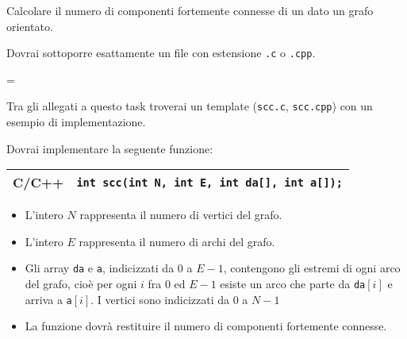 \usepackage{xcolor}
\usepackage{afterpage}
\usepackage{pifont,mdframed}
\usepackage[bottom]{footmisc}



\newcommand{\inputfile}{\texttt{input.txt}}
\newcommand{\outputfile}{\texttt{output.txt}}

\newenvironment{warning}
  {\par\begin{mdframed}[linewidth=2pt,linecolor=gray]%
    \begin{list}{}{\leftmargin=1cm
                   \labelwidth=\leftmargin}\item[\Large\ding{43}]}
  {\end{list}\end{mdframed}\par}

Calcolare il numero di componenti fortemente connesse di un dato un grafo orientato.

\Implementation


Dovrai sottoporre esattamente un file con estensione \texttt{.c} o \texttt{.cpp}.

\begin{warning}
Tra gli allegati a questo task troverai un template (\texttt{scc.c}, \texttt{scc.cpp}) con un esempio di implementazione.
\end{warning}

Dovrai implementare la seguente funzione:

\begin{center}\begin{tabularx}{\textwidth}{|c|X|}
\hline
C/C++  & \verb|int scc(int N, int E, int da[], int a[]);|\\
\hline
\end{tabularx}\end{center}

\begin{itemize}[nolistsep]
  \item L'intero $N$ rappresenta il numero di vertici del grafo.
  \item L'intero $E$ rappresenta il numero di archi del grafo.
  \item Gli array \texttt{da} e \texttt{a}, indicizzati da $0$ a $E-1$, contengono gli estremi di ogni arco del grafo, cioè per ogni $i$ fra $0$ ed $E-1$ esiste un arco che parte da \texttt{da}$[i]$ e arriva a \texttt{a}$[i]$. I vertici sono indicizzati da $0$ a $N-1$
  \item La funzione dovrà restituire il numero di componenti fortemente connesse.
\end{itemize}


